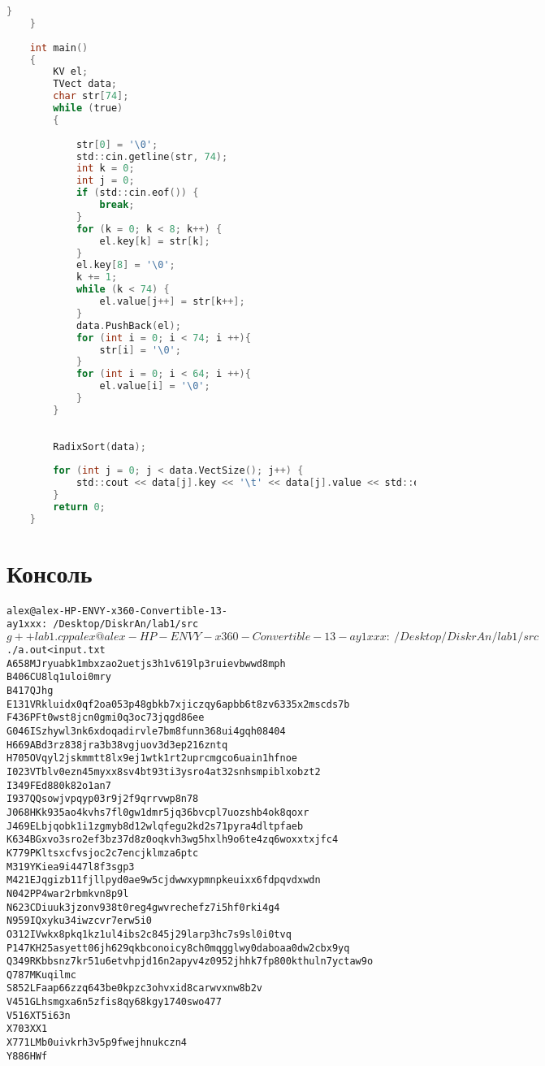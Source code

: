\documentclass[pdf, unicode, 12pt, a4paper,oneside,fleqn]{article}
\begin{document}
\begin{lstlisting}[language=C]
        }
    }
    
    int main()
    {
        KV el;
        TVect data;
        char str[74];
        while (true)
        {	
    
            str[0] = '\0';
            std::cin.getline(str, 74);
            int k = 0;
            int j = 0;
            if (std::cin.eof()) {
                break;
            }
            for (k = 0; k < 8; k++) {
                el.key[k] = str[k];
            }
            el.key[8] = '\0';
            k += 1;
            while (k < 74) {
                el.value[j++] = str[k++];
            }
            data.PushBack(el);
            for (int i = 0; i < 74; i ++){
                str[i] = '\0';
            }
            for (int i = 0; i < 64; i ++){
                el.value[i] = '\0';
            }
        }
    
    
        RadixSort(data);
        
        for (int j = 0; j < data.VectSize(); j++) {
            std::cout << data[j].key << '\t' << data[j].value << std::endl;
        }
        return 0;
    }
\end{lstlisting}


\section{Консоль}
\begin{alltt}
    alex@alex-HP-ENVY-x360-Convertible-13-ay1xxx:~/Desktop/DiskrAn/lab1/src$ g++ lab1.cpp
    alex@alex-HP-ENVY-x360-Convertible-13-ay1xxx:~/Desktop/DiskrAn/lab1/src$ ./a.out < input.txt
    A 658 MJ        ryuabk1mbxzao2uetjs3h1v619lp3ruievbwwd8mph
    B 406 CU        8lq1uloi0mry
    B 417 QJ        hg
    E 131 VR        kluidx0qf2oa053p48gbkb7xjiczqy6apbb6t8zv6335x2mscds7b
    F 436 PF        t0wst8jcn0gmi0q3oc73jqgd86ee
    G 046 IS        zhywl3nk6xdoqadirvle7bm8funn368ui4gqh08404
    H 669 AB        d3rz838jra3b38vgjuov3d3ep216zntq
    H 705 OV        qyl2jskmmtt8lx9ej1wtk1rt2uprcmgco6uain1hfnoe
    I 023 VT        blv0ezn45myxx8sv4bt93ti3ysro4at32snhsmpiblxobzt2
    I 349 FE        d880k82o1an7
    I 937 QQ        sowjvpqyp03r9j2f9qrrvwp8n78
    J 068 HK        k935ao4kvhs7fl0gw1dmr5jq36bvcpl7uozshb4ok8qoxr
    J 469 EL        bjqobk1i1zgmyb8d12wlqfegu2kd2s71pyra4dltpfaeb
    K 634 BG        xvo3sro2ef3bz37d8z0oqkvh3wg5hxlh9o6te4zq6woxxtxjfc4
    K 779 PK        ltsxcfvsjoc2c7encjklmza6ptc
    M 319 YK        iea9i447l8f3sgp3
    M 421 EJ        qgizb11fjllpyd0ae9w5cjdwwxypmnpkeuixx6fdpqvdxwdn
    N 042 PP        4war2rbmkvn8p9l
    N 623 CD        iuuk3jzonv938t0reg4gwvrechefz7i5hf0rki4g4
    N 959 IQ        xyku34iwzcvr7erw5i0
    O 312 IV        wkx8pkq1kz1ul4ibs2c845j29larp3hc7s9sl0i0tvq
    P 147 KH        25asyett06jh629qkbconoicy8ch0mqgglwy0daboaa0dw2cbx9yq
    Q 349 RK        bbsnz7kr51u6etvhpjd16n2apyv4z0952jhhk7fp800kthuln7yctaw9o
    Q 787 MK        uqilmc
    S 852 LF        aap66zzq643be0kpzc3ohvxid8carwvxnw8b2v
    V 451 GL        hsmgxa6n5zfis8qy68kgy1740swo477
    V 516 XT        5i63n
    X 703 XX        1
    X 771 LM        b0uivkrh3v5p9fwejhnukczn4
    Y 886 HW        f
\end{alltt}
\pagebreak
\end{document}

